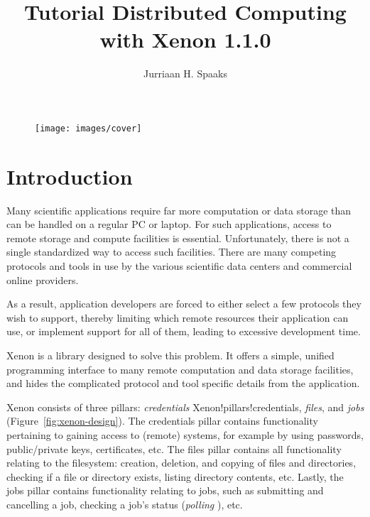 \documentclass[12pt, a4paper, twoside, openany, titlepage]{book}
\author{Jurriaan H. Spaaks}
\title{\textbf{Tutorial Distributed Computing with Xenon 1.1.0}}
\begin{document}

\pagestyle{empty}

\begin{figure}[ht]
\centering
\texttt{[image: images/cover]}
\end{figure}

\clearpage
{}
\frontmatter
\pagestyle{plain}
\tableofcontents

\mainmatter



\chapter{Introduction}

Many scientific applications require far more computation or data storage
than can be handled on a regular PC or laptop. For such applications, access
to remote storage and compute facilities is essential. Unfortunately, there
is not a single standardized way to access such facilities. There are many
competing protocols and tools in use by the various scientific data centers
and commercial online providers.

As a result, application developers are forced to either select a few
protocols they wish to support, thereby limiting which remote resources
their application can use, or implement support for all of them, leading to
excessive development time.

Xenon is a library designed to solve this problem. It offers a simple,
unified programming interface to many remote computation and data storage
facilities, and hides the complicated protocol and tool specific details
from the application.

Xenon consists of three pillars: \textit{credentials}\index
{Xenon!pillars!credentials}, \textit{files}, and
\textit{jobs} (Figure~\ref{fig:xenon-design}).
%
The credentials pillar contains functionality pertaining to gaining access
to (remote) systems, for example by using passwords, public/private keys,
certificates, etc.
%
The files pillar contains all functionality relating to the filesystem:
creation, deletion, and copying of files and directories, checking if a file
or directory exists, listing directory contents, etc.
%
Lastly, the jobs pillar contains functionality relating to jobs, such as
submitting and cancelling a job, checking a job's status (\textit{polling}
), etc.
\end{document}
